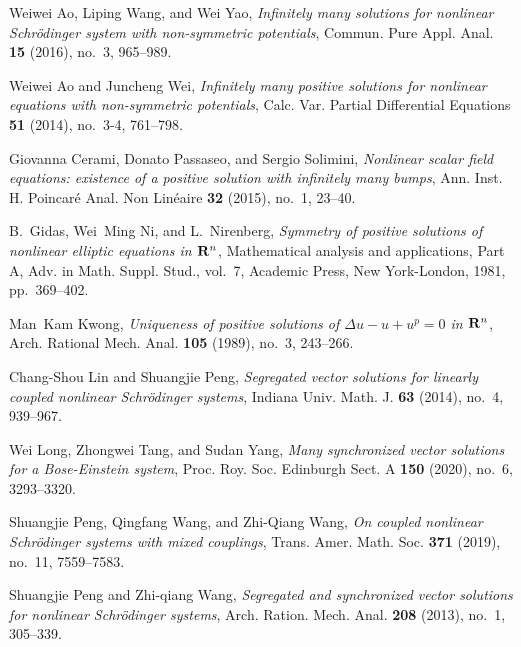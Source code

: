 \documentclass{amsart}
\theoremstyle{definition}
\theoremstyle{remark}
\numberwithin{equation}{section}
\begin{document}

\begin{thebibliography}{10}

Weiwei Ao, Liping Wang, and Wei Yao, \emph{Infinitely many solutions for
  nonlinear {S}chr\"{o}dinger system with non-symmetric potentials}, Commun.
  Pure Appl. Anal. \textbf{15} (2016), no.~3, 965--989. 

Weiwei Ao and Juncheng Wei, \emph{Infinitely many positive solutions for
  nonlinear equations with non-symmetric potentials}, Calc. Var. Partial
  Differential Equations \textbf{51} (2014), no.~3-4, 761--798. 

Giovanna Cerami, Donato Passaseo, and Sergio Solimini, \emph{Nonlinear scalar
  field equations: existence of a positive solution with infinitely many
  bumps}, Ann. Inst. H. Poincar\'{e} Anal. Non Lin\'{e}aire \textbf{32} (2015),
  no.~1, 23--40. 

B.~Gidas, Wei~Ming Ni, and L.~Nirenberg, \emph{Symmetry of positive solutions
  of nonlinear elliptic equations in {${\bf R}^{n}$}}, Mathematical analysis
  and applications, {P}art {A}, Adv. in Math. Suppl. Stud., vol.~7, Academic
  Press, New York-London, 1981, pp.~369--402. 

Man~Kam Kwong, \emph{Uniqueness of positive solutions of {$\Delta u-u+u^p=0$}
  in {${\bf R}^n$}}, Arch. Rational Mech. Anal. \textbf{105} (1989), no.~3,
  243--266. 

Chang-Shou Lin and Shuangjie Peng, \emph{Segregated vector solutions for
  linearly coupled nonlinear {S}chr\"{o}dinger systems}, Indiana Univ. Math. J.
  \textbf{63} (2014), no.~4, 939--967. 

Wei Long, Zhongwei Tang, and Sudan Yang, \emph{Many synchronized vector
  solutions for a {B}ose-{E}instein system}, Proc. Roy. Soc. Edinburgh Sect. A
  \textbf{150} (2020), no.~6, 3293--3320. 

Shuangjie Peng, Qingfang Wang, and Zhi-Qiang Wang, \emph{On coupled nonlinear
  {S}chr\"{o}dinger systems with mixed couplings}, Trans. Amer. Math. Soc.
  \textbf{371} (2019), no.~11, 7559--7583. 

Shuangjie Peng and Zhi-qiang Wang, \emph{Segregated and synchronized vector
  solutions for nonlinear {S}chr\"{o}dinger systems}, Arch. Ration. Mech. Anal.
  \textbf{208} (2013), no.~1, 305--339. 


\end{thebibliography}
\end{document}
